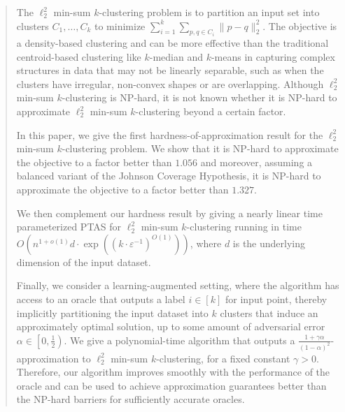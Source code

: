 \documentclass[11pt]{article}
\newcommand{\eps}{\varepsilon}
\begin{document}
\begin{abstract}
The $\ell_2^2$ min-sum $k$-clustering problem is to partition an input set into clusters $C_1,\ldots,C_k$ to minimize $\sum_{i=1}^k\sum_{p,q\in C_i}\|p-q\|_2^2$. The objective is a density-based clustering and can be more effective than the traditional centroid-based clustering like $k$-median and $k$-means in capturing complex structures in data that may not be linearly separable, such as when the clusters have irregular, non-convex shapes or are overlapping. Although $\ell_2^2$ min-sum $k$-clustering is NP-hard, it is not known whether it is NP-hard to approximate $\ell_2^2$ min-sum $k$-clustering beyond a certain factor. 

In this paper, we give the first hardness-of-approximation result for the $\ell_2^2$ min-sum $k$-clustering problem. We show that it is NP-hard to approximate the objective to a factor better than $1.056$ and moreover, assuming a balanced variant of the Johnson Coverage Hypothesis, it is  NP-hard to approximate the objective to a factor better than $1.327$. 

We then complement our hardness result by giving a nearly linear time parameterized PTAS for $\ell_2^2$ min-sum $k$-clustering running in time $O\left(n^{1+o(1)}d\cdot \exp((k\cdot\varepsilon^{-1})^{O(1)})\right)$, where $d$ is the underlying dimension of the input dataset.

Finally, we consider a learning-augmented setting, where the algorithm has access to an oracle that outputs a label $i\in[k]$ for input point, thereby implicitly partitioning the input dataset into $k$ clusters that induce an approximately optimal solution, up to some amount of adversarial error $\alpha\in\left[0,\frac{1}{2}\right)$. We give a polynomial-time algorithm that outputs a $\frac{1+\gamma\alpha}{(1-\alpha)^2}$-approximation to $\ell_2^2$ min-sum $k$-clustering, for a fixed constant $\gamma>0$. Therefore, our algorithm improves smoothly with the performance of the oracle and can be used to achieve approximation guarantees better than the NP-hard barriers for sufficiently accurate oracles. 
\end{abstract}

\end{document}

